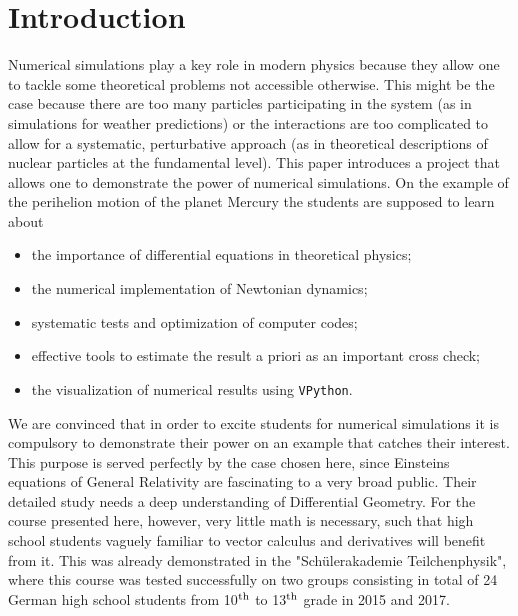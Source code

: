 \documentclass[12pt,ngerman,american]{iopart}
\newcommand{\vpython}[0]{\texttt{VPython}}
\begin{document}
\section{Introduction}\label{sec:intro}

Numerical simulations play a key role in modern physics because they allow one to tackle some theoretical problems not accessible otherwise. This might be the case because there are too many particles participating in the system (as in simulations for weather predictions) or the interactions are too complicated to allow for a systematic, perturbative approach (as in theoretical descriptions of nuclear particles at the fundamental level).
This paper introduces a project that allows one to demonstrate the power of numerical simulations.
On the example of the perihelion motion of the planet Mercury the students are supposed to learn about
\begin{itemize}
\item the importance of differential equations in theoretical physics;
\item the numerical implementation of Newtonian dynamics;
\item systematic tests and optimization of computer codes;
\item effective tools to estimate the result a priori as an important cross check;
\item the visualization of numerical results using \vpython{}.
\end{itemize}
We are convinced that in order to excite students for numerical simulations it is compulsory to demonstrate their power on an example that catches their interest.
This purpose is served perfectly by the case chosen here, since Einsteins equations of General Relativity are fascinating to a very broad public.
Their detailed study needs a deep understanding of Differential Geometry. For the course presented here, however, very little math is necessary, such that high school students vaguely familiar to vector calculus and derivatives will benefit from it.
This was already demonstrated in the "Sch\"ulerakademie Teilchenphysik", where this course was tested successfully on two groups consisting in total of 24 German high school students from 10$^{\rm th}$ to 13$^{\rm th}$ grade in 2015 and 2017.
\end{document}
